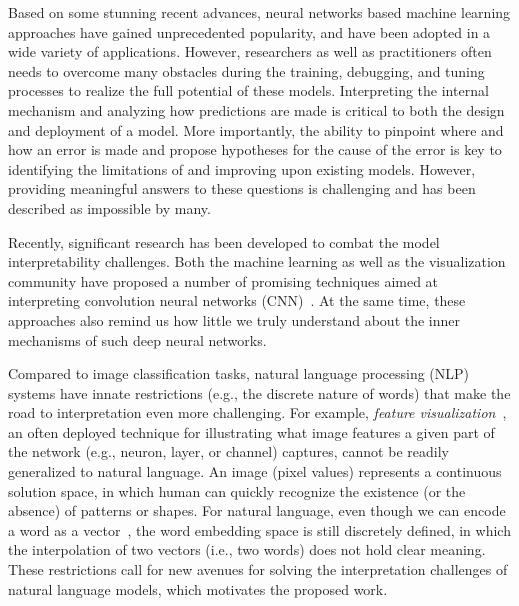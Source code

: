 \maketitle

Based on some stunning recent advances, neural networks based machine learning approaches have gained unprecedented popularity, and have been adopted in a wide variety of applications.
%
However, researchers as well as practitioners often needs to overcome many obstacles during the training, debugging, and tuning processes to realize the full potential of these models.
%
Interpreting the internal mechanism and analyzing how predictions are made is critical to both the design and deployment of a model.
More importantly, the ability to pinpoint where and how an error is made and propose hypotheses for the cause of the error is key to identifying the limitations of and improving upon existing models.
However, providing meaningful answers to these questions is challenging and has been described as impossible by many.

Recently, significant research has been developed to combat the model interpretability challenges.
Both the machine learning as well as the visualization community have proposed a number of promising techniques aimed at interpreting convolution neural networks (CNN)~\cite{SimonyanVedaldiZisserman2013, ZeilerFergus2014, YosinskiCluneNguyen2015, OlahMordvintsevSchubert2017, LiuShiLi2017, OlahSatyanarayanJohnson2018, BilalJourablooYe2018}. 
At the same time, these approaches also remind us how little we truly understand about the inner mechanisms of such deep neural networks.

Compared to image classification tasks, natural language processing (NLP) systems have innate restrictions (e.g., the discrete nature of words) that make the road to interpretation even more challenging.
For example, \emph{feature visualization}~\cite{OlahMordvintsevSchubert2017}, an often deployed technique for illustrating what image features a given part of the network (e.g., neuron, layer, or channel) captures, cannot be readily generalized to natural language. 
An image (pixel values) represents a continuous solution space, in which human can quickly recognize the existence (or the absence) of patterns or shapes. 
For natural language, even though we can encode a word as a vector~\cite{MikolovSutskeverChen2013, PenningtonSocherManning2014}, the word embedding space is still discretely defined, in which the interpolation of two vectors (i.e., two words) does not hold clear meaning.
%
These restrictions call for new avenues for solving the interpretation challenges of natural language models, which motivates the proposed work.

